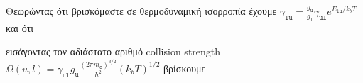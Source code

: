 Θεωρώντας ότι βρισκόμαστε σε θερμοδυναμική ισορροπία έχουμε 
$\gamma _\mathtt{lu} = \frac{g_\mathtt{u}}{g_\mathtt{l}}\gamma _\mathtt{ul}e^{E_\mathtt{lu}/k_b T}$ και ότι 


εισάγοντας τον αδιάστατο αριθμό collision strength $\Omega (u,l) = \gamma _\mathtt{ul} g_\mathtt{u} \frac{(2\pi m_\mathtt{e})^{3/2}}{h^2} (k_bT)^{1/2}$ βρίσκουμε



%
%
